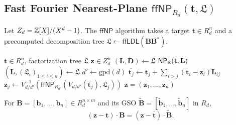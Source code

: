 \subsection{Fast Fourier Nearest-Plane \texorpdfstring{$\mathsf{ffNP}_{R_d}(\mathbf{t}, \mathfrak{L})$}{ffNP\_Rd(t,L)}}

Let $Z_d = \mathbb{Z}[X]/(X^d - 1)$. The $\mathsf{ffNP}$ algorithm takes a target $\mathbf{t} \in R_d^n$ and a precomputed decomposition tree $\mathfrak{L} \gets \mathsf{ffLDL}(\mathbf{BB}^*)$.

\begin{algorithm}[H]
	\caption{$\mathsf{ffNP}_{R_d}(\mathbf{t}, \mathfrak{L})$}
	\label{alg:ffnp}
	\begin{algorithmic}[1]
		\Require $\mathbf{t} \in R_d^n$, factorization tree $\mathfrak{L}$
		\Ensure $\mathbf{z} \in Z_d^n$
			\State $(\mathbf{L}, \mathbf{D}) \gets \mathfrak{L}$
			\State \Return $\mathsf{NP}_{\mathbb{R}}(\mathbf{t}, \mathbf{L})$
		\EndIf
		\State $(\mathbf{L}, (\mathfrak{L}_i)_{1 \leq i \leq n}) \gets \mathfrak{L}$
		\State $d' \gets \mathrm{gpd}(d)$
			\State $\overline{\mathbf{t}_j} \gets \mathbf{t}_j + \sum_{i>j} (\mathbf{t}_i - \mathbf{z}_i) \mathbf{L}_{ij}$
			\State $\mathbf{z}_j \gets V_{d/d'}^{-1}\!\left( \mathsf{ffNP}_{R_{d'}}(V_{d/d'}(\overline{\mathbf{t}_j}), \mathfrak{L}_j) \right)$
		\EndFor
		\State \Return $\mathbf{z} = (\mathbf{z}_1, \dots, \mathbf{z}_n)$
	\end{algorithmic}
\end{algorithm}

\begin{lemma}
	\label{lem:ffnp}
	For $\mathbf{B} = [\mathbf{b}_1, \dots, \mathbf{b}_n] \in R_d^{n \times m}$ and its GSO $\tilde{\mathbf{B}} = [\tilde{\mathbf{b}}_1, \dots, \tilde{\mathbf{b}}_n]$ in $R_d$,
	\[
		(\mathbf{z} - \mathbf{t}) \cdot \mathbf{B} = (\mathbf{z} - \overline{\mathbf{t}}) \cdot \tilde{\mathbf{B}}.
	\]
\end{lemma}

